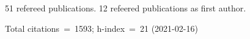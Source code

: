 51 refereed publications. 12 refeered publications as first author.

Total citations~=~1593; h-index~=~21 (2021-02-16)
